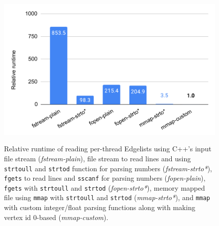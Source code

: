\begin{figure}[hbtp]
  \centering
  \includegraphics[width=0.99\linewidth]{out/optimize-el.pdf} \\[-2ex]
  \caption{Relative runtime of reading per-thread Edgelists using C++'s input file stream (\textit{fstream-plain}), file stream to read lines and using  \texttt{strtoull} and \texttt{strtod} function for parsing numbers (\textit{fstream-strto*}), \texttt{fgets} to read lines and \texttt{sscanf} for parsing numbers (\textit{fopen-plain}), \texttt{fgets} with \texttt{strtoull} and \texttt{strtod} (\textit{fopen-strto*}), memory mapped file using \texttt{mmap} with \texttt{strtoull} and \texttt{strtod} (\textit{mmap-strto*}), and \texttt{mmap} with custom integer/float parsing functions along with making vertex id 0-based (\textit{mmap-custom}).}
  \label{fig:optimize-el}
\end{figure}
